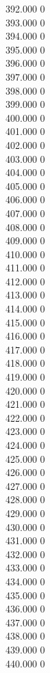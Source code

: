 { 392.000	0 \\
 393.000	0 \\
 394.000	0 \\
 395.000	0 \\
 396.000	0 \\
 397.000	0 \\
 398.000	0 \\
 399.000	0 \\
 400.000	0 \\
 401.000	0 \\
 402.000	0 \\
 403.000	0 \\
 404.000	0 \\
 405.000	0 \\
 406.000	0 \\
 407.000	0 \\
 408.000	0 \\
 409.000	0 \\
 410.000	0 \\
 411.000	0 \\
 412.000	0 \\
 413.000	0 \\
 414.000	0 \\
 415.000	0 \\
 416.000	0 \\
 417.000	0 \\
 418.000	0 \\
 419.000	0 \\
 420.000	0 \\
 421.000	0 \\
 422.000	0 \\
 423.000	0 \\
 424.000	0 \\
 425.000	0 \\
 426.000	0 \\
 427.000	0 \\
 428.000	0 \\
 429.000	0 \\
 430.000	0 \\
 431.000	0 \\
 432.000	0 \\
 433.000	0 \\
 434.000	0 \\
 435.000	0 \\
 436.000	0 \\
 437.000	0 \\
 438.000	0 \\
 439.000	0 \\
 440.000	0 \\
}
